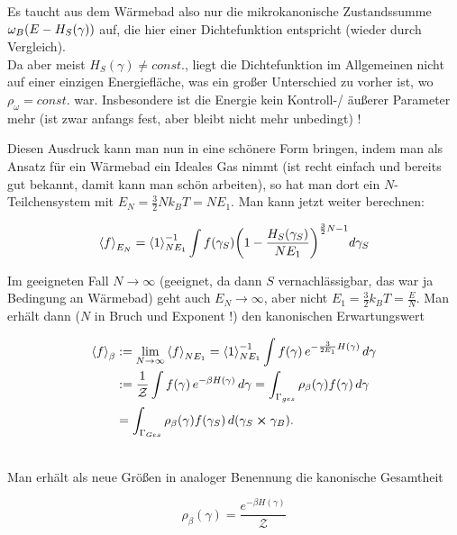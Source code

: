 \documentclass[../KlassMech_main.tex]{subfiles}
\begin{document}
Es taucht aus dem Wärmebad also nur die mikrokanonische Zustandssumme $\omega_B\qty(E-H_S(\gamma))$ auf, die hier einer Dichtefunktion entspricht (wieder durch Vergleich).\\
Da aber meist $H_S(\gamma) \neq const.$, liegt die Dichtefunktion im Allgemeinen nicht auf einer einzigen Energiefläche, was ein großer Unterschied zu vorher ist, wo $\rho_\omega = const.$ war. %
Insbesondere ist die Energie kein Kontroll-/ äußerer Parameter mehr (ist zwar anfangs fest, aber bleibt nicht mehr unbedingt) !

Diesen Ausdruck kann man nun in eine schönere Form bringen, indem man als Ansatz für ein Wärmebad ein Ideales Gas nimmt (ist recht einfach und bereits gut bekannt, damit kann man schön arbeiten), so hat man dort ein $N$-Teilchensystem mit $E_N = \frac{3}{2} N k_B T = N E_1$. Man kann jetzt weiter berechnen:

\begin{equation*}
\expval{f}_{E_N} = \expval{1}_{N E_1}^{-1} \int f(\gamma_S) \qty(1 - \frac{H_S(\gamma_S)}{N E_1})^{\frac{3}{2} N - 1} d\gamma_S
\end{equation*}

Im geeigneten Fall $N \rightarrow \infty$ (geeignet, da dann $S$ vernachlässigbar, das war ja Bedingung an Wärmebad) geht auch $E_N \rightarrow \infty$, aber nicht $E_1 = \frac{3}{2} k_B T = \frac{E}{N}$. Man erhält dann ($N$ in Bruch und Exponent !) den kanonischen Erwartungswert

\begin{align}
\expval{f}_\beta &:= \lim_{N \rightarrow \infty} \expval{f}_{N E_1} = \expval{1}_{N E_1}^{-1} \int f(\gamma) \, e^{-\frac{3}{2 E_1} H(\gamma)} \, d\gamma 
\notag\\
&:= \frac{1}{\mathcal{Z}} \int f(\gamma) \, e^{-\beta H(\gamma)} \, d\gamma = \int_{\Gamma_{ges}} \rho_\beta(\gamma) f(\gamma) \, d\gamma
\\
&= \int_{\Gamma_{Ges}} \rho_\beta(\gamma) f(\gamma_S) \, d\qty(\gamma_S \cross \gamma_B)\notag .
\end{align}

	\\

Man erhält als neue Größen in analoger Benennung die kanonische Gesamtheit

\begin{equation}
\rho_\beta(\gamma) = \frac{e^{-\beta H(\gamma)}}{\mathcal{Z}}
\end{equation}
\end{document}

